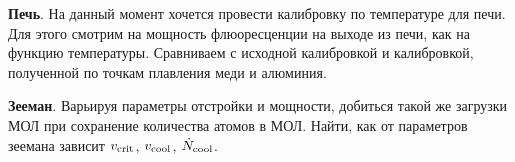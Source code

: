 \textbf{Печь}. На данный момент хочется провести калибровку по температуре для печи. Для этого смотрим на мощность флюоресценции на выходе из печи, как на функцию температуры. Сравниваем с исходной калибровкой и калибровкой, полученной по точкам плавления меди и алюминия. 

\textbf{Зееман}. Варьируя параметры отстройки и мощности, добиться такой же загрузки МОЛ при сохранение количества атомов в МОЛ. Найти, как от параметров зеемана зависит $v_{\textnormal{crit}}$, $v_{\textnormal{cool}}$, $\dot{N}_{\textnormal{cool}}$.
